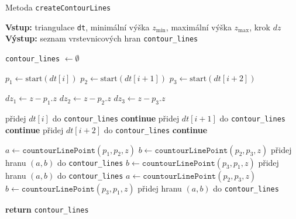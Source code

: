 \begin{algorithm}
    \caption{Metoda \texttt{createContourLines}}
    \begin{algorithmic}[1]
        \STATE \textbf{Vstup:} triangulace \texttt{dt}, minimální výška $z_{\min}$, maximální výška $z_{\max}$, krok $dz$
        \STATE \textbf{Výstup:} seznam vrstevnicových hran \texttt{contour\_lines}

        \STATE \texttt{contour\_lines} $\gets \emptyset$

                \STATE $p_1 \gets \text{start}(dt[i])$
                \STATE $p_2 \gets \text{start}(dt[i+1])$
                \STATE $p_3 \gets \text{start}(dt[i+2])$

                \STATE $dz_1 \gets z - p_1.z$
                \STATE $dz_2 \gets z - p_2.z$
                \STATE $dz_3 \gets z - p_3.z$

                    \STATE přidej $dt[i]$ do \texttt{contour\_lines}
                    \STATE \textbf{continue}
                \ENDIF
                    \STATE přidej $dt[i+1]$ do \texttt{contour\_lines}
                    \STATE \textbf{continue}
                \ENDIF
                    \STATE přidej $dt[i+2]$ do \texttt{contour\_lines}
                    \STATE \textbf{continue}
                \ENDIF

                    \STATE $a \gets \texttt{countourLinePoint}(p_1, p_2, z)$
                        \STATE $b \gets \texttt{countourLinePoint}(p_2, p_3, z)$
                        \STATE přidej hranu $(a, b)$ do \texttt{contour\_lines}
                        \STATE $b \gets \texttt{countourLinePoint}(p_3, p_1, z)$
                        \STATE přidej hranu $(a, b)$ do \texttt{contour\_lines}
                    \ENDIF
                    \STATE $a \gets \texttt{countourLinePoint}(p_2, p_3, z)$
                        \STATE $b \gets \texttt{countourLinePoint}(p_3, p_1, z)$
                        \STATE přidej hranu $(a, b)$ do \texttt{contour\_lines}
                    \ENDIF
                \ENDIF
            \ENDFOR
        \ENDFOR

        \STATE \textbf{return} \texttt{contour\_lines}
    \end{algorithmic}
\end{algorithm}


